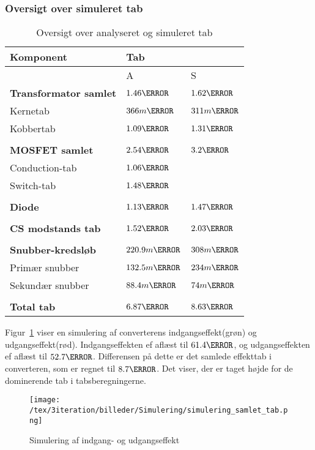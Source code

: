 \subsubsection{Oversigt over simuleret tab}
\begin{table}[H] 			
	\centering
	\begin{tabularx}{\textwidth}{|X|l|l|}
		\hline
		\textbf{\large Komponent} & \multicolumn{2}{|l|}{\textbf{\large Tab}} \\ \hline
		& A & S	\\ \hline
		\textbf{Transformator samlet} & $1.46\watt$ & $1.62\watt$ \\ \hline 
		Kernetab & $366m\watt$ & $311m\watt$ \\ \hline
		Kobbertab & $1.09\watt$ & $1.31\watt$ \\ \hline
		& &	\\ \hline
		\textbf{MOSFET samlet} & $2.54\watt$ & $3.2\watt$ \\ \hline
		Conduction-tab & $1.06\watt$ & 	\\ \hline
		Switch-tab & $1.48\watt$ & 		\\ \hline
		& &	\\ \hline
		\textbf{Diode} & $1.13\watt$ & $1.47\watt$ \\ \hline
		& &	\\ \hline
		\textbf{CS modstands tab} & $1.52\watt$ & $2.03\watt$ \\ \hline
		& &	\\ \hline
		\textbf{Snubber-kredsløb} & $220.9m\watt$ & $308m\watt$ \\ \hline
		Primær snubber	& $132.5m\watt$	& $234m\watt$		\\ \hline
		Sekundær snubber &	$88.4m\watt$ &	$74m\watt$		\\ \hline
		& &	\\ \hline
		\textbf{Total tab} & $6.87\watt$ & $8.63\watt$ \\ \hline
	\end{tabularx}
	\caption{Oversigt over analyseret og simuleret tab}
	\label{tab:simulering_tab_3}
\end{table}

Figur~\ref{fig:simulering_power_samlet} viser en simulering af converterens indgangseffekt(grøn) og udgangseffekt(rød). Indgangseffekten ef aflæst til $61.4\watt$, og udgangseffekten ef aflæst til $52.7\watt$. Differensen på dette er det samlede effekttab i converteren, som er regnet til $8.7\watt$. Det viser, der er taget højde for de dominerende tab i tabsberegningerne. 

\begin{figure}[H]
	\center
	\texttt{[image: /tex/3iteration/billeder/Simulering/simulering\_samlet\_tab.png]}
	\caption{Simulering af indgang- og udgangseffekt}
	\label{fig:simulering_power_samlet}
\end{figure}